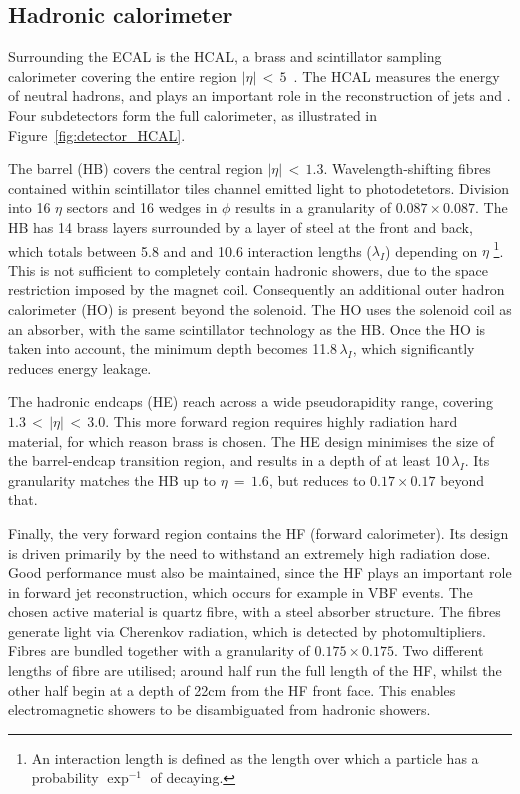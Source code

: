 \subsection{Hadronic calorimeter}

Surrounding the ECAL is the HCAL, a brass and scintillator sampling calorimeter covering the entire region $|\eta|\,<\,5$~\cite{CMSdetector,cmsHcal}.
The HCAL measures the energy of neutral hadrons, and plays an important role in the reconstruction of jets and \met.
Four subdetectors form the full calorimeter, as illustrated in Figure~\ref{fig:detector_HCAL}.

The barrel (HB) covers the central region $|\eta|\,<\,1.3$.
Wavelength-shifting fibres contained within scintillator tiles channel emitted light to photodetetors.
Division into 16 $\eta$ sectors and 16 wedges in $\phi$ results in a granularity of $0.087\times0.087$.
The HB has 14 brass layers surrounded by a layer of steel at the front and back, 
which totals between 5.8 and and 10.6 interaction lengths ($\lambda_I$) depending on $\eta$
\footnote{An interaction length is defined as the length over which 
a particle has a probability $\exp^{-1}$ of decaying.}.
This is not sufficient to completely contain hadronic showers, due to the space restriction imposed by the magnet coil.
Consequently an additional outer hadron calorimeter (HO) is present beyond the solenoid.
The HO uses the solenoid coil as an absorber, with the same scintillator technology as the HB.
Once the HO is taken into account, the minimum depth becomes 11.8\,$\lambda_I$, 
which significantly reduces energy leakage. %

The hadronic endcaps (HE) reach across a wide pseudorapidity range, covering $1.3\,<\,|\eta|\,<\,3.0$.
This more forward region requires highly radiation hard material, for which reason brass is chosen. %
The HE design minimises the size of the barrel-endcap transition region, and results in a depth of at least 10\,$\lambda_I$.
Its granularity matches the HB up to $\eta\,=\,1.6$, but reduces to $0.17\times0.17$ beyond that.

Finally, the very forward region contains the HF (forward calorimeter).
Its design is driven primarily by the need to withstand an extremely high radiation dose.
Good performance must also be maintained, since the HF plays an important role in forward jet reconstruction, which occurs for example in VBF \Hgg events.
The chosen active material is quartz fibre, with a steel absorber structure.
The fibres generate light via Cherenkov radiation, which is detected by photomultipliers.
Fibres are bundled together with a granularity of $0.175\times0.175$.
Two different lengths of fibre are utilised; 
around half run the full length of the HF, whilst the other half begin at a depth of 22cm from the HF front face.
This enables electromagnetic showers to be disambiguated from hadronic showers.

